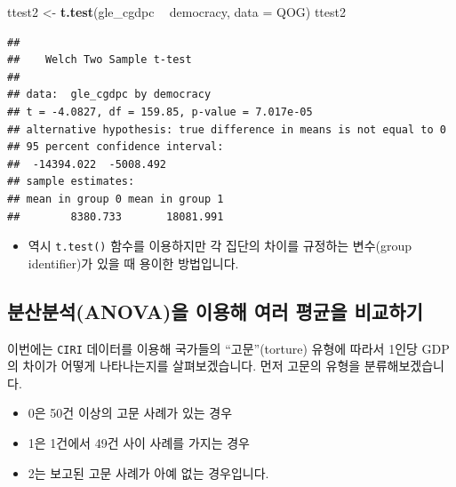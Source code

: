 \documentclass[]{book}
\newenvironment{Shaded}{\begin{snugshade}}{\end{snugshade}}
\newcommand{\DataTypeTok}[1]{\textcolor[rgb]{0.13,0.29,0.53}{#1}}
\newcommand{\KeywordTok}[1]{\textcolor[rgb]{0.13,0.29,0.53}{\textbf{#1}}}
\newcommand{\NormalTok}[1]{#1}
\newcommand{\OperatorTok}[1]{\textcolor[rgb]{0.81,0.36,0.00}{\textbf{#1}}}
\newcommand{\StringTok}[1]{\textcolor[rgb]{0.31,0.60,0.02}{#1}}
\providecommand{\tightlist}{%
  \setlength{\itemsep}{0pt}\setlength{\parskip}{0pt}}
\begin{document}
\begin{Shaded}
\begin{Highlighting}[]
\NormalTok{ttest2 <-}\StringTok{ }\KeywordTok{t.test}\NormalTok{(gle_cgdpc }\OperatorTok{~}\StringTok{ }\NormalTok{democracy, }\DataTypeTok{data =}\NormalTok{ QOG)}
\NormalTok{ttest2}
\end{Highlighting}
\end{Shaded}

\begin{verbatim}
## 
##    Welch Two Sample t-test
## 
## data:  gle_cgdpc by democracy
## t = -4.0827, df = 159.85, p-value = 7.017e-05
## alternative hypothesis: true difference in means is not equal to 0
## 95 percent confidence interval:
##  -14394.022  -5008.492
## sample estimates:
## mean in group 0 mean in group 1 
##        8380.733       18081.991
\end{verbatim}

\begin{itemize}
\tightlist
\item
  역시 \texttt{t.test()} 함수를 이용하지만 각 집단의 차이를 규정하는 변수(group identifier)가 있을 때 용이한 방법입니다.
\end{itemize}

\hypertarget{uxbd84uxc0b0uxbd84uxc11danovauxc744-uxc774uxc6a9uxd574-uxc5ecuxb7ec-uxd3c9uxade0uxc744-uxbe44uxad50uxd558uxae30}{%
\subsection{분산분석(ANOVA)을 이용해 여러 평균을 비교하기}\label{uxbd84uxc0b0uxbd84uxc11danovauxc744-uxc774uxc6a9uxd574-uxc5ecuxb7ec-uxd3c9uxade0uxc744-uxbe44uxad50uxd558uxae30}}

이번에는 \texttt{CIRI} 데이터를 이용해 국가들의 ``고문''(torture) 유형에 따라서 1인당 GDP의 차이가 어떻게 나타나는지를 살펴보겠습니다. 먼저 고문의 유형을 분류해보겠습니다.

\begin{itemize}
\tightlist
\item
  0은 50건 이상의 고문 사례가 있는 경우
\item
  1은 1건에서 49건 사이 사례를 가지는 경우
\item
  2는 보고된 고문 사례가 아예 없는 경우입니다.
\end{itemize}

\begin{Shaded}
\end{Shaded}
\end{document}

